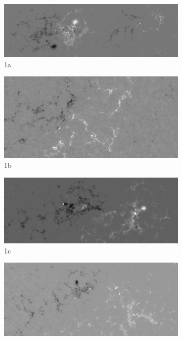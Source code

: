 \documentclass[12pt,a4paper,spanish]{article}
\begin{document}
\begin{figure}[h!]
    \centering    
    \begin{subfigure}{.5\textwidth}
    \centering
    \includegraphics[width=.8\linewidth,scale=0.8]{Br+maskal_92_events.png}
    \caption{1a}
    \label{fig:sfig11}
    \end{subfigure}%
    \begin{subfigure}{.5\textwidth}
    \centering
    \includegraphics[width=.8\linewidth,scale=0.8]{Br+maskal_135_events.png}
    \caption{1b}
    \label{fig:sfig12}
    \end{subfigure}
    \begin{subfigure}{.5\textwidth}
    \centering
    \includegraphics[width=.8\linewidth,scale=0.8]{Br+maskal_175_events.png}
    \caption{1c}
    \label{fig:sfig13}
    \end{subfigure}%
    \begin{subfigure}{.5\textwidth}
    \centering
    \includegraphics[width=.8\linewidth,scale=0.8]{Br+maskal_211_events.png}

\end{subfigure}
\end{figure}
\end{document}
